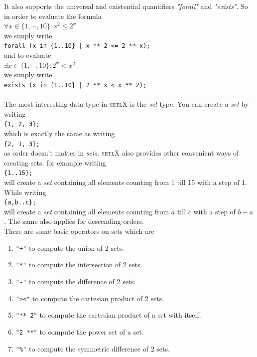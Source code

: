 \documentclass[11pt]{report}
\begin{document}
It also supports the universal and existential quantifiers \textsl{"forall"} and \textsl{"exists"}.
So in order to evaluate the formula
\\[0.2cm]
\hspace*{1.3cm}
$\forall x \in \{ 1, \cdots, 10 \}: x^2 \leq 2^x$
\\[0.2cm]
we simply write
\\[0.2cm]
\hspace*{1.3cm}
\texttt{forall (x in \{1..10\} | x ** 2 <= 2 ** x);}
\\[0.2cm]
and to evaluate
\\[0.2cm]
\hspace*{1.3cm}
$\exists x \in \{ 1, \cdots, 10 \}: 2^x < x^2$
\\[0.2cm]
we simply write
\\[0.2cm]
\hspace*{1.3cm}
\texttt{exists (x in \{1..10\} | 2 ** x < x ** 2);}
\\[0.2cm]
\\
The most interesting data type in \textsc{setlX} is the \textsl{set} type. You can create a \textsl{set} by writing
\\[0.2cm]
\hspace*{1.3cm}
\texttt{\{1, 2, 3\};}
\\[0.2cm]
which is exactly the same as writing
\\[0.2cm]
\hspace*{1.3cm}
\texttt{\{2, 1, 3\};}
\\[0.2cm]
as order doesn't matter in \textsl{sets}. \textsc{setlX} also provides other convenient ways of creating sets, for example writing
\\[0.2cm]
\hspace*{1.3cm}
\texttt{\{1..15\};}
\\[0.2cm]
will create a \textsl{set} containing all elements counting from 1 till 15 with a step of 1. While writing
\\[0.2cm]
\hspace*{1.3cm}
\texttt{\{a,b..c\};}
\\[0.2cm]
will create a \textsl{set} containing all elements counting from $a$ till $c$ with a step of $b-a$. The same also applies for descending orders.
\\
There are some basic operators on sets which are
\begin{enumerate}
\item \texttt{"+"} to compute the union of 2 sets.
\item \texttt{"*"} to compute the intersection of 2 sets.
\item \texttt{"-"} to compute the difference of 2 sets.
\item \texttt{"><"} to compute the cartesian product of 2 sets.
\item \texttt{"** 2"} to compute the cartesian product of a set with itself.
\item \texttt{"2 **"} to compute the power set of a set.
\item \texttt{"\%"} to compute the symmetric difference of 2 sets.
\end{enumerate}
\end{document}
